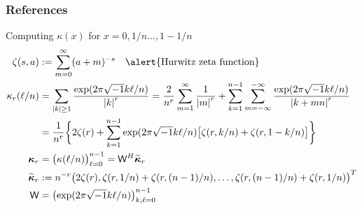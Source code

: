 \documentclass[10pt,compress,xcolor={usenames,dvipsnames},aspectratio=169]{beamer}
\newcommand{\talert}[1]{\alert{\text{#1}}}
\begin{document}
\thankyouframe


\begin{frame}
	\frametitle{References}
\printbibliography
\end{frame}





\begin{frame}[label=kappaDeriv]{Computing $\kappa(x)$ for $x = 0, 1/n \ldots, 1-1/n$}
	\vspace{-8ex}
	\begin{align*}
	\zeta(s,a) &: = \sum_{m=0}^\infty (a+m)^{-s}  \quad \talert{Hurwitz zeta function}\\
	\kappa_r(\ell/n) & = \sum_{\abs{k} \ge 1} \frac{\exp(2\pi\sqrt{-1} k\ell/n)}{\abs{k}^{r}} 
	= \frac{2}{n^{r}}  \sum_{m=1}^\infty \frac{1}{\abs{m}^{r}} 
	+ 
	\sum_{k=1}^{n-1}  \sum_{m=-\infty}^{-\infty} \frac{\exp(2\pi\sqrt{-1} k\ell/n)}{\abs{k+mn}^{r}} 
	\\
	& = \frac{1}{n^{r}} \biggl\{2\zeta(r)
	+ 
	\sum_{k=1}^{n - 1} \exp(2\pi\sqrt{-1} k\ell/n) \bigl[ \zeta(r,k/n) + \zeta(r,1-k/n)\bigr] \biggr\} \\
	\vkappa_r & = \bigl( \kappa(\ell/n) \bigr)_{\ell = 0}^{n-1} = \mW^H \widetilde{\vkappa}_r \\
	\widetilde{\vkappa}_r & : = n^{-r}\bigl(2 \zeta(r), \zeta(r,1/n) + \zeta(r,(n-1)/n), \ldots, \zeta(r,(n-1)/n) + \zeta(r,1/n)  \bigr)^T \\
	\mW & = \bigl(\exp( 2 \pi \sqrt{-1} k \ell/n)\bigr)_{k,\ell =0}^{n-1}
	\end{align*}
	\hyperlink{flexible<3>}{}
\end{frame}
\end{document}

